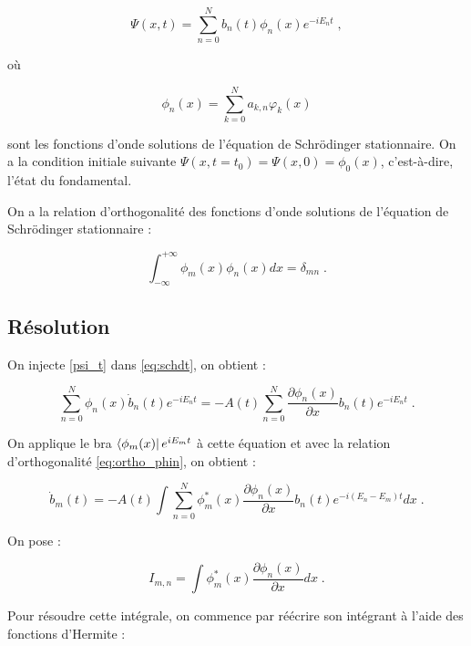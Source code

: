 \documentclass{report}
\begin{document}
\begin{equation}\label{psi_t}
\Psi(x,t)= \sum_{n=0}^N b_{n}(t)\phi_n(x) e^{-iE_{n}t}\;,
\end{equation}

où 

\begin{equation}
\phi_n(x)= \sum_{k=0}^N a_{k,n} \varphi_k(x)
\end{equation}

sont les fonctions d'onde solutions de l'équation de Schrödinger stationnaire. On a la condition initiale suivante $\Psi(x,t=t_{0})= \Psi(x,0) = \phi_{0}(x)$, c'est-à-dire, l'état du fondamental.

On a la relation d'orthogonalité des fonctions d'onde solutions de l'équation de Schrödinger stationnaire :

\begin{equation}\label{eq:ortho_phin}
\int_{-\infty}^{+\infty} \phi_m(x) \phi_n(x) dx = \delta_{mn}\;.
\end{equation}

\subsection{Résolution}

On injecte \eqref{psi_t} dans \eqref{eq:schdt}, on obtient :

\begin{equation}
\sum_{n=0}^{N}\phi_{n}(x)\dot{b}_{n}(t) e^{-iE_{n}t} = - A(t) \sum_{n=0}^{N}\frac{\partial \phi_{n}(x)}{\partial x}b_{n}(t) e^{-iE_{n}t}\;.
\end{equation}

On applique le bra $\bra{\phi_{m}(x)} e^{iE_{m}t}$ à cette équation et avec la relation d'orthogonalité \eqref{eq:ortho_phin}, on obtient :

\begin{equation}
\dot{b}_{m}(t) = - A(t) \int \sum_{n=0}^{N}\phi_{m}^{\ast}(x)\frac{\partial \phi_{n}(x)}{\partial x}b_{n}(t) e^{-i(E_{n}-E_{m})t} dx\;.
\end{equation}

On pose :

\begin{equation}
I_{m,n}= \int \phi_{m}^{\ast}(x)\frac{\partial \phi_{n}(x)}{\partial x} dx\;.
\end{equation}

Pour résoudre cette intégrale, on commence par réécrire son intégrant à l'aide des fonctions d'Hermite :
\end{document}
